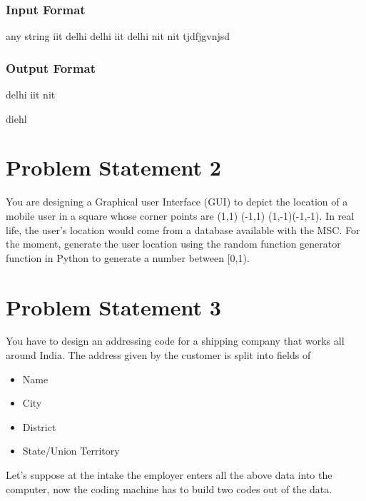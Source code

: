 \documentclass[10pt]{article}
\begin{document}
\subsubsection{Input Format}
any string iit delhi delhi iit delhi nit nit tjdfjgvnjsd 
   
 
 
 

\subsubsection{Output Format}

delhi iit nit

diehl
\bigskip








\bigskip 

 




\newpage
\section{Problem Statement 2}


You are designing a Graphical user Interface (GUI) to depict the location of a mobile user in a square whose corner points are (1,1) (-1,1) (1,-1)(-1,-1). In real life, the user’s location would come from a database available with the MSC. For the moment, generate the user location using the random function generator function in Python to generate a number between [0,1). 


 
\newpage




\pagebreak
\section{Problem Statement 3}
You have to design an addressing code for a shipping company that works all around India. The address given by the customer is split into fields of
\begin{itemize}
\item{Name}
\item{City}
\item{District}
\item{State/Union Territory}
\end{itemize}
Let's suppose at the intake the employer enters all the above data into the computer, now the coding machine has to build two codes out of the data.
\end{document}
